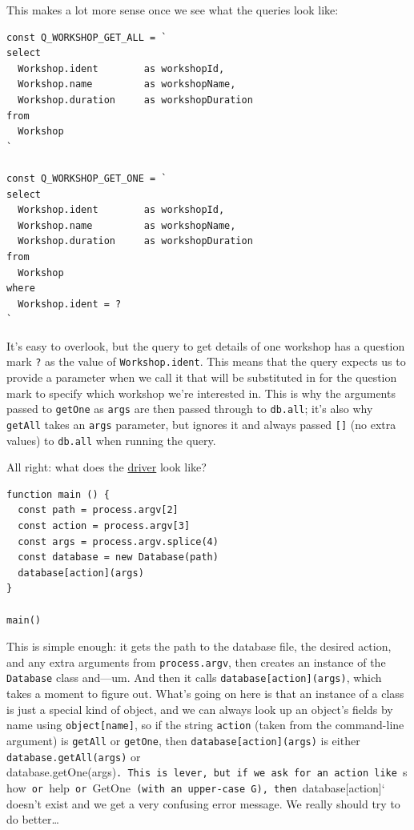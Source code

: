 This makes a lot more sense once we see what the queries look like:

\begin{verbatim}
const Q_WORKSHOP_GET_ALL = `
select
  Workshop.ident        as workshopId,
  Workshop.name         as workshopName,
  Workshop.duration     as workshopDuration
from
  Workshop
`

const Q_WORKSHOP_GET_ONE = `
select
  Workshop.ident        as workshopId,
  Workshop.name         as workshopName,
  Workshop.duration     as workshopDuration
from
  Workshop
where
  Workshop.ident = ?
`
\end{verbatim}

It's easy to overlook, but the query to get details of one workshop has
a question mark \texttt{?} as the value of \texttt{Workshop.ident}. This
means that the query expects us to provide a parameter when we call it
that will be substituted in for the question mark to specify which
workshop we're interested in. This is why the arguments passed to
\texttt{getOne} as \texttt{args} are then passed through to
\texttt{db.all}; it's also why \texttt{getAll} takes an \texttt{args}
parameter, but ignores it and always passed \texttt{{[}{]}} (no extra
values) to \texttt{db.all} when running the query.

All right: what does the \protect\hyperlink{g:driver}{driver} look like?

\begin{verbatim}
function main () {
  const path = process.argv[2]
  const action = process.argv[3]
  const args = process.argv.splice(4)
  const database = new Database(path)
  database[action](args)
}

main()
\end{verbatim}

This is simple enough: it gets the path to the database file, the
desired action, and any extra arguments from \texttt{process.argv}, then
creates an instance of the \texttt{Database} class and---um. And then it
calls \texttt{database{[}action{]}(args)}, which takes a moment to
figure out. What's going on here is that an instance of a class is just
a special kind of object, and we can always look up an object's fields
by name using \texttt{object{[}name{]}}, so if the string
\texttt{action} (taken from the command-line argument) is
\texttt{getAll} or \texttt{getOne}, then
\texttt{database{[}action{]}(args)} is either
\texttt{database.getAll(args)} or
database.getOne(args)\texttt{.\ This\ is\ lever,\ but\ if\ we\ ask\ for\ an\ action\ like\ }show\texttt{\ or\ }help\texttt{\ or\ }GetOne\texttt{\ (with\ an\ upper-case\ \textquotesingle{}G\textquotesingle{}),\ then\ }database{[}action{]}`
doesn't exist and we get a very confusing error message. We really
should try to do better\ldots{}

